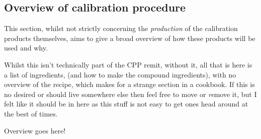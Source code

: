 
\subsection{Overview of calibration procedure}
This section, whilst not strictly concerning the \emph{production} of the calibration products themselves, aims to give a broad overview of how these products will be used and why. 
\begin{note}
Whilst this isn't technically part of the CPP remit, without it, all that is here is a list of ingredients, (and how to make the compound ingredients), with no overview of the recipe, which makes for a strange section in a cookbook. If this is no desired or should live somewhere else then feel free to move or \emph{re}move it, but I felt like it should be in here as this stuff is not easy to get ones head around at the best of times.
\end{note}

Overview goes here! \xxx

